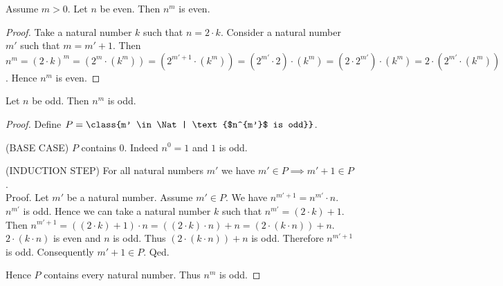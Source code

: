 \documentclass[../../arithmetic.tex]{subfiles}
\begin{document}
  \begin{forthel}
    \begin{proposition}\label{Arithmetic_03_07_192104}
      Assume $m > 0$.
      Let $n$ be even.
      Then $n^{m}$ is even.
    \end{proposition}
    \begin{proof}
      Take a natural number $k$ such that $n = 2 \cdot k$.
      Consider a natural number $m'$ such that $m = m' + 1$.
      Then $n^{m} =
      (2 \cdot k)^{m} =
      (2^{m} \cdot (k^{m})) =
      (2^{m' + 1} \cdot (k^{m})) =
      (2^{m'} \cdot 2) \cdot (k^{m}) =
      (2 \cdot 2^{m'}) \cdot (k^{m}) =
      2 \cdot (2^{m'} \cdot (k^{m}))$.
      Hence $n^{m}$ is even.
    \end{proof}

    \begin{proposition}\label{Arithmetic_03_07_330205}
      Let $n$ be odd.
      Then $n^{m}$ is odd.
    \end{proposition}
    \begin{proof}
      Define $P = \class{m' \in \Nat | \text{$n^{m'}$ is odd}}$.

      (BASE CASE) $P$ contains $0$.
      Indeed $n^{0} = 1$ and $1$ is odd.

      (INDUCTION STEP) For all natural numbers $m'$ we have $m' \in P \implies m' + 1 \in P$. \\
      Proof.
        Let $m'$ be a natural number.
        Assume $m' \in P$.
        We have $n^{m' + 1} = n^{m'} \cdot n$.
        $n^{m'}$ is odd.
        Hence we can take a natural number $k$ such that $n^{m'} = (2 \cdot k) + 1$.
        Then $n^{m' + 1} =
        ((2 \cdot k) + 1) \cdot n =
        ((2 \cdot k) \cdot n) + n =
        (2 \cdot (k \cdot n)) + n$.
        $2 \cdot (k \cdot n)$ is even and $n$ is odd.
        Thus $(2 \cdot (k \cdot n)) + n$ is odd.
        Therefore $n^{m' + 1}$ is odd.
        Consequently $m' + 1 \in P$.
      Qed.

      Hence $P$ contains every natural number.
      Thus $n^{m}$ is odd.
    \end{proof}
  \end{forthel}
\end{document}
